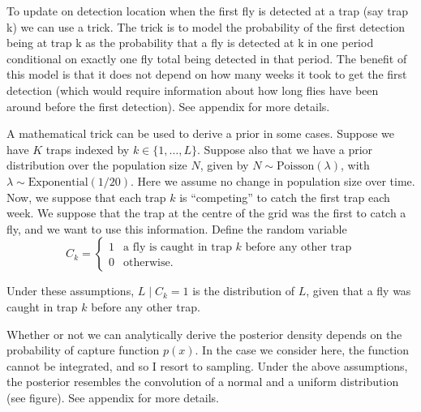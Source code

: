 \documentclass[
  oneside]{book}
\begin{document}
To update on detection location when the first fly is detected at a trap (say trap k) we can use a trick. The trick is to model the probability of the first detection being at trap k as the probability that a fly is detected at k in one period conditional on exactly one fly total being detected in that period. The benefit of this model is that it does not depend on how many weeks it took to get the first detection (which would require information about how long flies have been around before the first detection). See appendix for more details.

A mathematical trick can be used to derive a prior in some cases. Suppose we have \(K\) traps indexed by \(k \in \{1, \ldots, L\}\). Suppose also that we have a prior distribution over the population size \(N\), given by \(N \sim \mathrm{Poisson} (\lambda)\), with \(\lambda \sim \mathrm{Exponential(1/20)}\). Here we assume no change in population size over time. Now, we suppose that each trap \(k\) is ``competing'' to catch the first trap each week. We suppose that the trap at the centre of the grid was the first to catch a fly, and we want to use this information. Define the random variable
\[
C_k = \begin{cases}1 & \text{a fly is caught in trap } k \text{ before any other trap} \\ 0 & \text{otherwise}. \end{cases}
\]

Under these assumptions, \(L \mid C_k = 1\) is the distribution of \(L\), given that a fly was caught in trap \(k\) before any other trap.

Whether or not we can analytically derive the posterior density depends on the probability of capture function \(p(x)\). In the case we consider here, the function cannot be integrated, and so I resort to sampling. Under the above assumptions, the posterior resembles the convolution of a normal and a uniform distribution (see figure). See appendix for more details.

  
\end{document}
